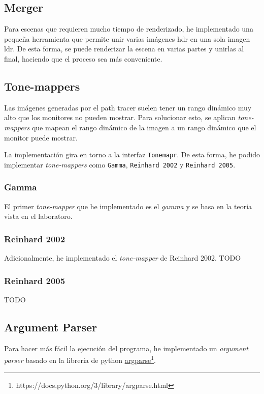 \documentclass{article}
\begin{document}
\subsection{Merger}
Para escenas que requieren mucho tiempo de renderizado, he implementado una
pequeña herramienta que permite unir varias imágenes hdr en una sola imagen ldr.
De esta forma, se puede renderizar la escena en varias partes y unirlas al
final, haciendo que el proceso sea más conveniente.

\subsection{Tone-mappers}
Las imágenes generadas por el path tracer suelen tener un rango dinámico muy
alto que los monitores no pueden mostrar. Para solucionar esto, se aplican
\textit{tone-mappers} que mapean el rango dinámico de la imagen a un rango
dinámico que el monitor puede mostrar.

La implementación gira en torno a la interfaz \texttt{Tonemapr}. De esta forma,
he podido implementar \textit{tone-mappers} como \texttt{Gamma}, \texttt{Reinhard
  2002} y \texttt{Reinhard 2005}.

\subsubsection{Gamma}
El primer \textit{tone-mapper} que he implementado es el \textit{gamma} y se basa en la teoria vista en el laboratoro.

\subsubsection{Reinhard 2002}
Adicionalmente, he implementado el \textit{tone-mapper} de Reinhard 2002.
TODO

\subsubsection{Reinhard 2005}
TODO

\subsection{Argument Parser}
Para hacer más fácil la ejecución del programa, he implementado un \textit{argument
parser} basado en la libreria de python
\href{https://docs.python.org/3/library/argparse.html}{argparse}\footnote{https://docs.python.org/3/library/argparse.html}.
\end{document}
